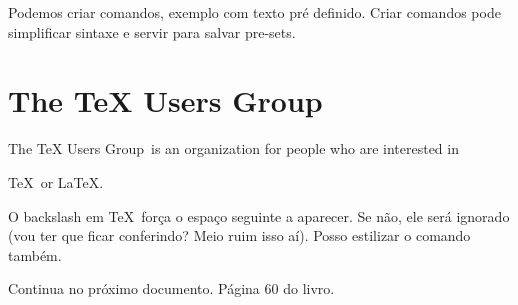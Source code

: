 \documentclass{article}
\begin{document}
Podemos criar comandos, exemplo com texto pré definido.
Criar comandos pode simplificar sintaxe e servir para salvar
pre-sets.

\newcommand{\TUG}{TeX Users Group}

\section{The \TUG}

The \TUG\ is an organization for people who are interested in 

\TeX\ or \LaTeX.

\newcommand{\TUG}{\textsc{TeX Users Group}}

O backslash em \TeX\ força o espaço seguinte a aparecer.
Se não, ele será ignorado
(vou ter que ficar conferindo? Meio ruim isso aí).
Posso estilizar o comando também.

Continua no próximo documento. Página 60 do livro.
\end{document}
